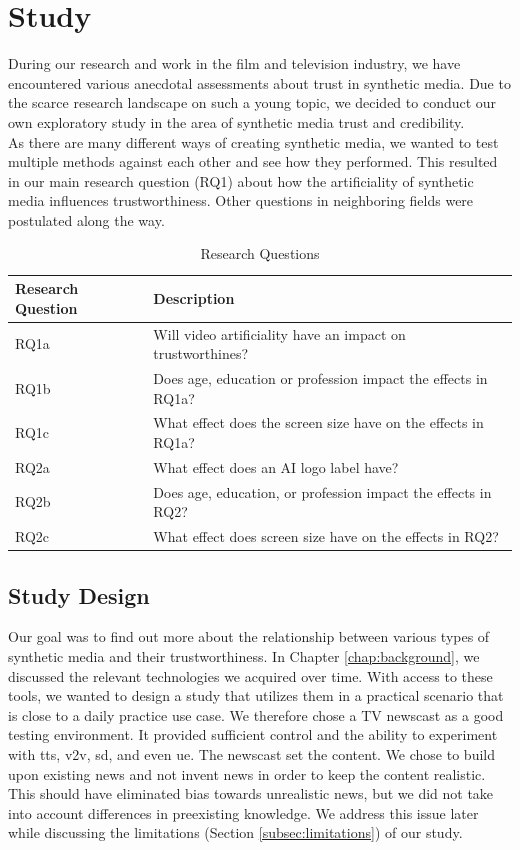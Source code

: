 \documentclass[
  a4paper,  %
  twoside,  %
  bibliography=totoc,
  headsepline,
  cleardoublepage=empty,
  parskip=half,
  draft=false
]{scrbook}
\begin{document}
\chapter{Study}
\label{chap:study}

During our research and work in the film and television industry, we have encountered various anecdotal assessments about trust in synthetic media. Due to the scarce research landscape on such a young topic, we decided to conduct our own exploratory study in the area of synthetic media trust and credibility. \\
As there are many different ways of creating synthetic media, we wanted to test multiple methods against each other and see how they performed. This resulted in our main research question (RQ1) about how the artificiality of synthetic media influences trustworthiness. Other questions in neighboring fields were postulated along the way.

\begin{table}[h]
  \centering
  \begin{tabularx}{\textwidth}{l|X}
    \textbf{Research Question} & \textbf{Description}\\
    \midrule
    RQ1a & Will video artificiality have an impact on trustworthines?  \\
    \midrule
    RQ1b & Does age, education or profession impact the effects in RQ1a?  \\
    \midrule
    RQ1c & What effect does the screen size have on the effects in RQ1a?  \\
    \midrule
    RQ2a & What effect does an AI logo label have?\\
    \midrule
    RQ2b & Does age, education, or profession impact the effects in RQ2?  \\
    \midrule
    RQ2c & What effect does screen size have on the effects in RQ2?  \\
  \end{tabularx}
  \caption{Research Questions}
  \label{tab:research-questions}
\end{table}

\section{Study Design}
\label{sec:study design}

Our goal was to find out more about the relationship between various types of synthetic media and their trustworthiness. In Chapter \ref{chap:background}, we discussed the relevant technologies we acquired over time. With access to these tools, we wanted to design a study that utilizes them in a practical scenario that is close to a daily practice use case. We therefore chose a TV newscast as a good testing environment. It provided sufficient control and the ability to experiment with \gls{tts}, \gls{v2v}, \gls{sd}, and even \gls{ue}. The newscast set the content. We chose to build upon existing news and not invent news in order to keep the content realistic. This should have eliminated bias towards unrealistic news, but we did not take into account differences in preexisting knowledge. We address this issue later while discussing the limitations (Section \ref{subsec:limitations}) of our study.
\end{document}
